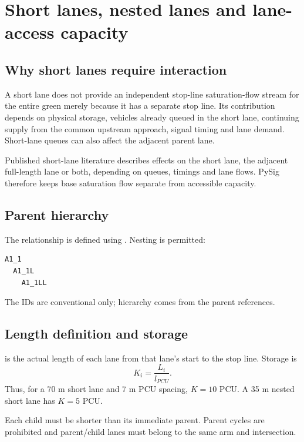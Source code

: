 \chapter{Short lanes, nested lanes and lane-access capacity}
\label{chap:short-lanes}

\section{Why short lanes require interaction}
A short lane does not provide an independent stop-line saturation-flow stream for the
entire green merely because it has a separate stop line.  Its contribution depends on
physical storage, vehicles already queued in the short lane, continuing supply from the
common upstream approach, signal timing and lane demand.  Short-lane queues can also
affect the adjacent parent lane.

Published short-lane literature describes effects on the short lane, the adjacent
full-length lane or both, depending on queues, timings and lane flows.  PySig therefore
keeps base saturation flow separate from accessible capacity.

\section{Parent hierarchy}
The relationship is defined using .  Nesting is permitted:
\begin{verbatim}
A1_1
  A1_1L
    A1_1LL
\end{verbatim}
The IDs are conventional only; hierarchy comes from the parent references.

\section{Length definition and storage}
 is the actual length of each lane from that lane's start to
the stop line.  Storage is
\begin{equation}
K_i=\frac{L_i}{l_{PCU}}.
\end{equation}
Thus, for a 70 m short lane and 7 m PCU spacing, $K=10$ PCU.  A 35 m nested short lane
has $K=5$ PCU.

Each child must be shorter than its immediate parent.  Parent cycles are prohibited and
parent/child lanes must belong to the same arm and intersection.

